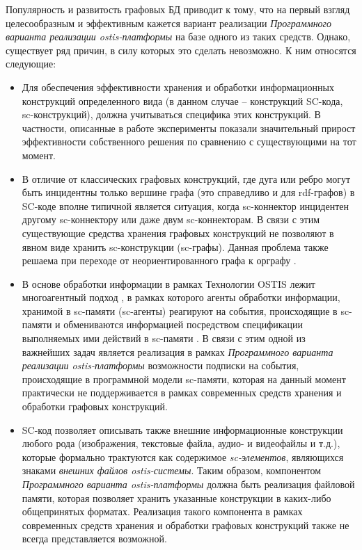 Популярность и развитость графовых БД приводит к тому, что на первый взгляд целесообразным и эффективным кажется вариант реализации \textit{Программного варианта реализации ostis-платформы} на базе одного из таких средств. Однако, существует ряд причин, в силу которых это сделать невозможно. К ним относятся следующие:
\begin{itemize}
    \item Для обеспечения эффективности хранения и обработки информационных конструкций определенного вида (в данном случае -- конструкций SC-кода, sc-конструкций), должна учитываться специфика этих конструкций. В частности, описанные в работе \cite{Koronchik2013} эксперименты показали значительный прирост эффективности собственного решения по сравнению с существующими на тот момент.
    \item В отличие от классических графовых конструкций, где дуга или ребро могут быть инцидентны только вершине графа (это справедливо и для rdf-графов) в SC-коде вполне типичной является ситуация, когда sc-коннектор инцидентен другому sc-коннектору или даже двум sc-коннекторам. В связи с этим существующие средства хранения графовых конструкций не позволяют в явном виде хранить sc-конструкции (sc-графы). Данная проблема также решаема при переходе от неориентированного графа к орграфу \cite{Ivashenko2015}.
    \item В основе обработки информации в рамках Технологии OSTIS лежит многоагентный подход \cite{iotti2018agent}, в рамках которого агенты обработки информации, хранимой в sc-памяти (sc-агенты) реагируют на события, происходящие в sc-памяти и обмениваются информацией посредством спецификации выполняемых ими действий в sc-памяти \cite{Shunkevich2018}. В связи с этим одной из важнейших задач является реализация в рамках \textit{Программного варианта реализации ostis-платформы} возможности подписки на события, происходящие в программной модели sc-памяти, которая на данный момент практически не поддерживается в рамках современных средств хранения и обработки графовых конструкций.
    \item SC-код позволяет описывать также внешние информационные конструкции любого рода (изображения, текстовые файла, аудио- и видеофайлы и т.д.), которые формально трактуются как содержимое \textit{sc-элементов}, являющихся знаками \textit{внешних файлов ostis-системы}. Таким образом, компонентом \textit{Программного варианта ostis-платформы} должна быть реализация файловой памяти, которая позволяет хранить указанные конструкции в каких-либо общепринятых форматах. Реализация такого компонента в рамках современных средств хранения и обработки графовых конструкций также не всегда представляется возможной.
\end{itemize}

